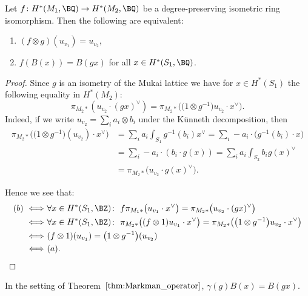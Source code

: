 \begin{Lemma} %
Let $f \colon H^{\ast}(M_1, \BQ) \to H^{\ast}(M_2, \BQ)$ be a degree-preserving isometric ring isomorphism.
Then the following are equivalent:
\begin{enumerate}
\item[$(a)$] $(f \otimes g)(u_{v_1}) = u_{v_2}$,
\item[$(b)$] $f(B(x)) = B(gx)$ for all $x \in H^{\ast}(S_1,\BQ)$.
\end{enumerate}
\end{Lemma}

\begin{proof}
Since $g$ is an isometry of the Mukai lattice we have for $x \in H^{\ast}(S_1)$ the following equality in $H^{\ast}(M_2)$:
\[
\pi_{M_2 \ast}(u_{v_2} \cdot (gx)^{\vee}) = \pi_{M_2 \ast}\big( \big(1 \otimes g^{-1}\big) u_{v_2} \cdot x^{\vee} \big).
\]
{\samepage
Indeed, if we write $u_{v_2} = \sum_i a_i \otimes b_i$ under the K\"unneth decomposition, then
\begin{align*}
\pi_{M_2 \ast}\big( \big(1 \otimes g^{-1}\big)( u_{v_2} ) \cdot x^{\vee} \big)
& = \sum_i a_i \int_{S_1} g^{-1}(b_i) x^{\vee}
 = \sum_i -a_i \cdot \big(g^{-1}(b_i) \cdot x\big) \\
& = \sum_i -a_i \cdot (b_i \cdot g(x))  = \sum_i a_i \int_{S_2} b_i g(x)^{\vee} \\
& =  \pi_{M_2 \ast}\big( u_{v_2} \cdot g(x)^{\vee} \big).
\end{align*}}

Hence we see that:
\begin{align*}
(b) \ \Longleftrightarrow \ & \forall x \in H^{\ast}(S_1, \BZ) \colon \ f \pi_{M_1 \ast}\big(u_{v_1} \cdot x^{\vee}\big) = \pi_{M_2 \ast}\big( u_{v_2} \cdot (gx)^{\vee} \big) \\
\Longleftrightarrow\ & \forall x \in H^{\ast}(S_1, \BZ) \colon \ \pi_{M_2 \ast}\big( (f \otimes 1)u_{v_1} \cdot x^{\vee} \big) = \pi_{M_2 \ast}\big( \big(1 \otimes g^{-1}\big)u_{v_2} \cdot x^{\vee} \big) \\
\Longleftrightarrow\ & (f \otimes 1)(u_{v_1}) = \big(1 \otimes g^{-1}\big)(u_{v_2}) \\
\Longleftrightarrow\ & (a).
\tag*{\qed}
\end{align*}
\renewcommand{\qed}{}
\end{proof}


\begin{cor} \label{corX}
In the setting of Theorem~$\ref{thm:Markman_operator}$, $\gamma(g) B(x) = B(gx)$.
\end{cor}


